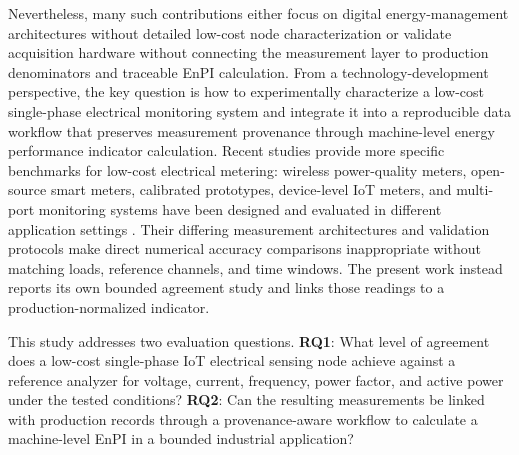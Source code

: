 \documentclass[technologies,article,submit,pdftex,moreauthors]{Definitions/mdpi}
\begin{document}
Nevertheless, many such contributions either focus on digital energy-management architectures without detailed low-cost node characterization or validate acquisition hardware without connecting the measurement layer to production denominators and traceable EnPI calculation. From a technology-development perspective, the key question is how to experimentally characterize a low-cost single-phase electrical monitoring system and integrate it into a reproducible data workflow that preserves measurement provenance through machine-level energy performance indicator calculation. Recent studies provide more specific benchmarks for low-cost electrical metering: wireless power-quality meters, open-source smart meters, calibrated prototypes, device-level IoT meters, and multi-port monitoring systems have been designed and evaluated in different application settings \cite{r3_sousa2023,r3_openz2018,r3_calibration2019,r3_iotmeter2022,r3_conti2023}. Their differing measurement architectures and validation protocols make direct numerical accuracy comparisons inappropriate without matching loads, reference channels, and time windows. The present work instead reports its own bounded agreement study and links those readings to a production-normalized indicator.

This study addresses two evaluation questions. \textbf{RQ1}: What level of agreement does a low-cost single-phase IoT electrical sensing node achieve against a reference analyzer for voltage, current, frequency, power factor, and active power under the tested conditions? \textbf{RQ2}: Can the resulting measurements be linked with production records through a provenance-aware workflow to calculate a machine-level EnPI in a bounded industrial application?
\end{document}
